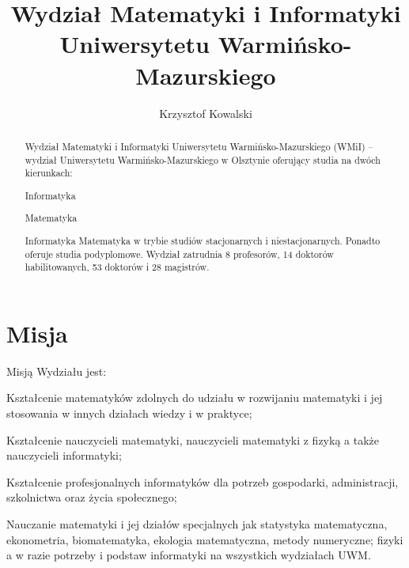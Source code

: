 \documentclass[a4paper,12pt]{article}
\title{Wydział Matematyki i Informatyki Uniwersytetu
Warmińsko-Mazurskiego}
\author{Krzysztof Kowalski}
\begin{document}
\maketitle

\begin{abstract}
Wydział Matematyki i Informatyki Uniwersytetu Warmińsko-Mazurskiego (WMiI) – wydział
Uniwersytetu Warmińsko-Mazurskiego w Olsztynie oferujący studia na dwóch kierunkach:
\begin{typ_listy}
  \item Informatyka
  \item Matematyka
\item
\end{typ_listy}
Informatyka
Matematyka
w trybie studiów stacjonarnych i niestacjonarnych. Ponadto oferuje studia podyplomowe.
Wydział zatrudnia 8 profesorów, 14 doktorów habilitowanych, 53 doktorów i 28 magistrów.

\end{abstract}
\section{Misja}\label{sec:Misja}
Misją Wydziału jest:
\begin{typ_listy}
\item Kształcenie matematyków zdolnych do udziału w rozwijaniu matematyki i jej stosowania w innych
działach wiedzy i w praktyce;
\item Kształcenie nauczycieli matematyki, nauczycieli matematyki z fizyką a także nauczycieli informatyki;
\item Kształcenie profesjonalnych informatyków dla potrzeb gospodarki, administracji, szkolnictwa oraz życia
społecznego;
\item Nauczanie matematyki i jej działów specjalnych jak statystyka matematyczna, ekonometria,
biomatematyka, ekologia matematyczna, metody numeryczne; fizyki a w razie potrzeby i podstaw
informatyki na wszystkich wydziałach UWM.
\end{typ_listy}
\end{document}
